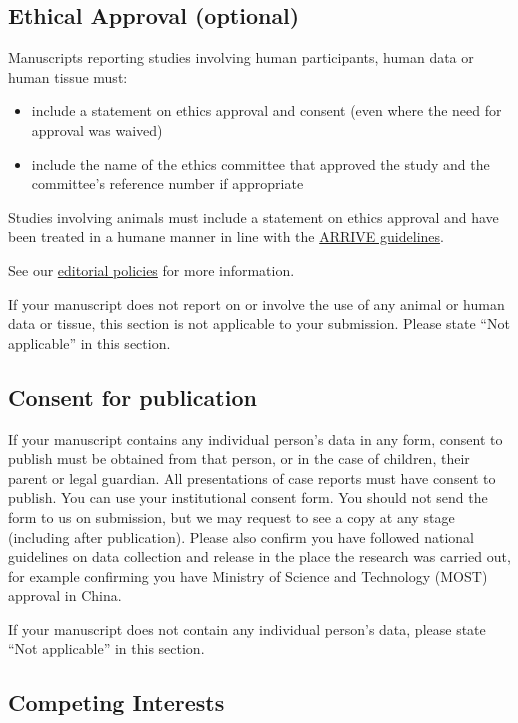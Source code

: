 \documentclass[a4paper,alpha-refs]{aejstyles}
\begin{document}
\subsection{Ethical Approval (optional)}
Manuscripts reporting studies involving human participants, human data or human tissue must:

\begin{itemize}
\item include a statement on ethics approval and consent (even where the need for approval was waived)
\item include the name of the ethics committee that approved the study and the committee's reference number if appropriate
\end{itemize}

Studies involving animals must include a statement on ethics approval and have been treated in a humane manner in line with the \href{http://www.nc3rs.org.uk/arrive-guidelines}{ARRIVE guidelines}.

See our \href{https://academic.oup.com/Astronomy Education Journal/pages/editorial_policies_and_reporting_standards}{editorial policies} for more information.

If your manuscript does not report on or involve the use of any animal or human data or tissue, this section is not applicable to your submission. Please state ``Not applicable'' in this section.

\subsection{Consent for publication}

If your manuscript contains any individual person's data in any form, consent to publish must be obtained from that person, or in the case of children, their parent or legal guardian. All presentations of case reports must have consent to publish. You can use your institutional consent form. You should not send the form to us on submission, but we may request to see a copy at any stage (including after publication). Please also confirm you have followed national guidelines on data collection and release in the place the research was carried out, for example confirming you have Ministry of Science and Technology (MOST) approval in China.

If your manuscript does not contain any individual person's data, please state ``Not applicable'' in this section.

\subsection{Competing Interests}
\end{document}
